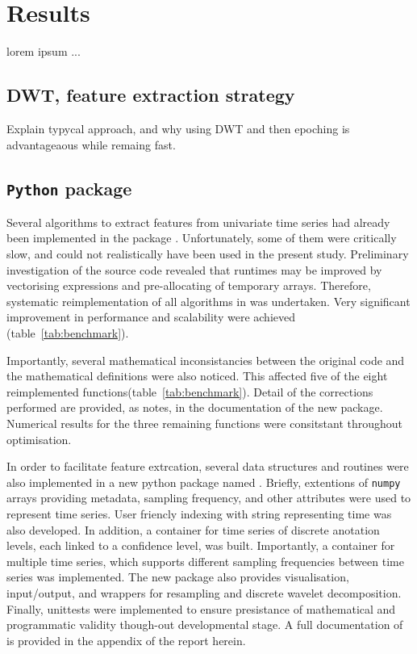 \section{Results} \label{results}

lorem ipsum ...

\subsection{DWT, feature extraction strategy}
Explain typycal approach, and why using DWT and then epoching is advantageaous while remaing fast.


\subsection{\texttt{Python} package}
Several algorithms to extract features from univariate time series had already been implemented in the \py{} package \pyeeg{}\citationneeded{}.
Unfortunately, some of them were critically slow, and could not realistically have been used in the present study.
Preliminary investigation of the source code revealed that runtimes may be improved by vectorising expressions and pre-allocating of temporary arrays.
Therefore, systematic reimplementation of all algorithms in \pyeeg{} was undertaken.
Very significant improvement in performance and scalability were achieved (table~\ref{tab:benchmark}).

Importantly, several mathematical inconsistancies between the original code and the mathematical definitions were also noticed.
This affected five of the eight reimplemented functions(table~\ref{tab:benchmark}). 
Detail of the corrections performed are provided, as notes, in the documentation of the new package.
Numerical results for the three remaining functions were consitstant throughout optimisation.

In order to facilitate feature extrcation, several data structures and routines were also implemented 
in a new python package named \pr{}.
Briefly, extentions of \texttt{numpy} arrays providing metadata, sampling frequency, and other attributes were used to represent time series. 
User friencly indexing with string representing time was also developed.
In addition, a container for time series of discrete anotation levels, each linked to a confidence level, was built.
Importantly, a container for multiple time series, which supports different sampling frequencies
between time series was implemented.
The new package also provides visualisation, input/output, and wrappers for resampling and discrete wavelet decomposition.
Finally, unittests were implemented to ensure presistance of mathematical and programmatic validity though-out developmental stage.
A full documentation of \pr{} is provided in the appendix of the report herein.


